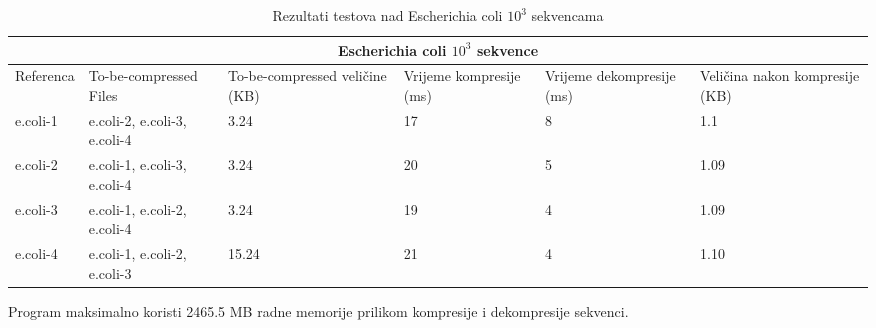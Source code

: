 \begin{table}[h!]
	\centering
	\begin{tabular}{ |p{2cm}|p{2cm}|p{2cm}|p{2cm}|p{2cm}|p{2cm}|  }
		\hline
		\multicolumn{6}{|c|}{Escherichia coli $10^3$ sekvence} \\
		\hline
		Referenca & To-be-compressed Files & To-be-compressed veličine (KB)& Vrijeme kompresije (ms) & Vrijeme dekompresije (ms) & Veličina nakon kompresije (KB)\\
		\hline
		e.coli-1 & e.coli-2,
		 e.coli-3,
		  e.coli-4 &  3.24 & 17 & 8 & 1.1\\
		  \hline
		e.coli-2& e.coli-1,
		 e.coli-3,
		  e.coli-4 &  3.24 & 20 & 5 & 1.09\\
		  \hline
		e.coli-3& e.coli-1,
		 e.coli-2,
		  e.coli-4 &  3.24 & 19 & 4 & 1.09\\
		  \hline
		e.coli-4& e.coli-1,
		 e.coli-2,
		  e.coli-3 &  15.24 & 21 & 4 & 1.10\\
	
		\hline
	\end{tabular}
	\caption{Rezultati testova nad Escherichia coli $10^3$ sekvencama}
	\label{table:1}
\end{table}

Program maksimalno koristi 2465.5 MB radne memorije prilikom kompresije i dekompresije sekvenci.